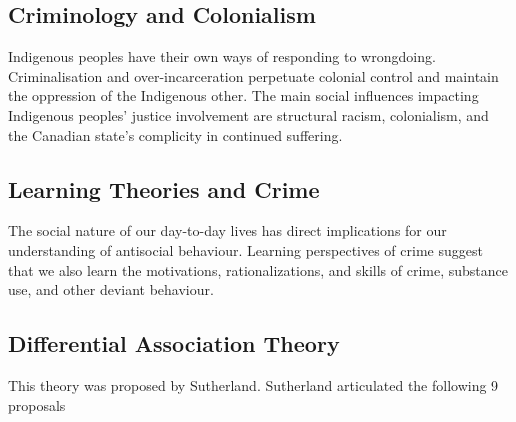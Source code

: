 \documentclass[11pt]{article}
\begin{document}
\subsection{Criminology and Colonialism}

Indigenous peoples have their own ways of responding to wrongdoing. Criminalisation and over-incarceration perpetuate colonial control and maintain the oppression of the Indigenous other.	The main social influences impacting Indigenous peoples’ justice involvement are structural racism, colonialism, and the Canadian state’s complicity in continued suffering.

\subsection{Learning Theories and Crime}

The social nature of our day-to-day lives has direct implications for our understanding of antisocial behaviour. Learning perspectives of crime suggest that we also learn the motivations, rationalizations, and skills of crime, substance use, and other deviant behaviour.

\subsection{Differential Association Theory}

This theory was proposed by Sutherland. Sutherland articulated the following 9 proposals
\end{document}
